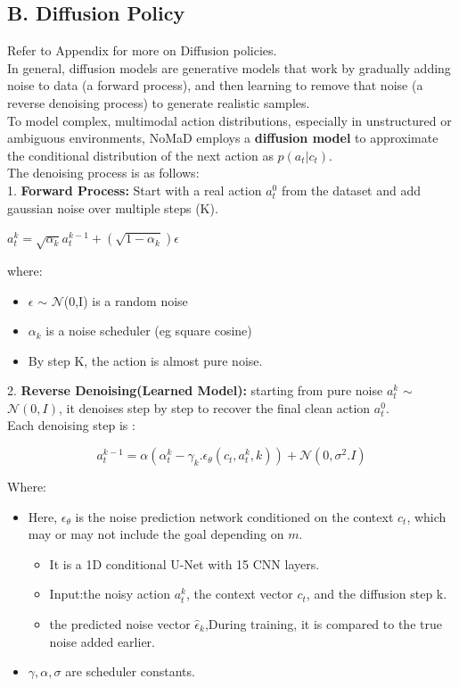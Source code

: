 \documentclass[12pt]{article}
\begin{document}
\subsection*{B. Diffusion Policy}
Refer to Appendix for more on Diffusion policies.\\
In general, diffusion models are generative models that work by gradually adding noise to data (a forward process), and then learning to remove that noise (a reverse denoising process) to generate realistic samples.\\
To model complex, multimodal action distributions, especially in unstructured or ambiguous environments, NoMaD employs a \textbf{diffusion model} to approximate the conditional distribution of the next action as $p(a_t | c_t)$. \\
The denoising process is as follows:\\
1. \textbf{Forward Process:} Start with a real action $a^{0}_t$ from the dataset and add gaussian noise over multiple steps (K). 
\begin{center}
    $a^{k}_t = \sqrt{\alpha_k} a^{k-1}_t + (\sqrt{1 - \alpha_k}) \epsilon$
\end{center}
where:\\
\begin{itemize}
    \item $\epsilon$ $\sim$ $\mathcal{N}$(0,I) is a random noise
    \item $\alpha_k$ is a noise scheduler (eg square cosine)
    \item By step K, the action is almost pure noise.
\end{itemize}
2. \textbf{Reverse Denoising(Learned Model):} starting from pure noise $a^{k}_t$ $\sim$ $\mathcal{N}(0,I)$, it denoises step by step to recover the final clean action $a^{0}_t$.\\
Each denoising step is :
\begin{center}
    \[a^{k-1}_t = \alpha(\alpha^{k}_t-\gamma_k.\epsilon_{\theta}(c_t, a^{k}_t,k)) + \mathcal{N}(0,\sigma^2.I)\]
\end{center}
Where:
\begin{itemize}
    \item Here, $\epsilon_\theta$ is the noise prediction network conditioned on the context $c_t$, which may or may not include the goal depending on $m$.
    \begin{itemize}
        \item It is a 1D conditional U-Net with 15 CNN layers.
        \item Input:the noisy action $a^{k}_t$, the context vector $c_t$, and the diffusion step k.
        \item the predicted noise vector $\hat{\epsilon}_k$,During training, it is compared to the true noise added earlier.
    \end{itemize}
    \item $\gamma, \alpha ,\sigma$ are scheduler constants.
\end{itemize}
\end{document}
